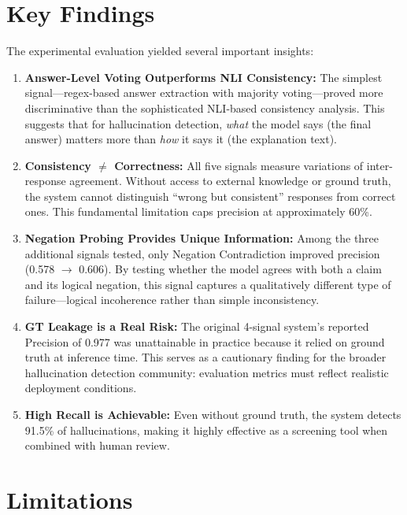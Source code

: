 \section{Key Findings}

The experimental evaluation yielded several important insights:

\begin{enumerate}
    \item \textbf{Answer-Level Voting Outperforms NLI Consistency:} The simplest signal---regex-based answer extraction with majority voting---proved more discriminative than the sophisticated NLI-based consistency analysis. This suggests that for hallucination detection, \textit{what} the model says (the final answer) matters more than \textit{how} it says it (the explanation text).

    \item \textbf{Consistency $\neq$ Correctness:} All five signals measure variations of inter-response agreement. Without access to external knowledge or ground truth, the system cannot distinguish ``wrong but consistent'' responses from correct ones. This fundamental limitation caps precision at approximately 60\%.

    \item \textbf{Negation Probing Provides Unique Information:} Among the three additional signals tested, only Negation Contradiction improved precision (0.578 $\rightarrow$ 0.606). By testing whether the model agrees with both a claim and its logical negation, this signal captures a qualitatively different type of failure---logical incoherence rather than simple inconsistency.

    \item \textbf{GT Leakage is a Real Risk:} The original 4-signal system's reported Precision of 0.977 was unattainable in practice because it relied on ground truth at inference time. This serves as a cautionary finding for the broader hallucination detection community: evaluation metrics must reflect realistic deployment conditions.

    \item \textbf{High Recall is Achievable:} Even without ground truth, the system detects 91.5\% of hallucinations, making it highly effective as a screening tool when combined with human review.
\end{enumerate}

\section{Limitations}


